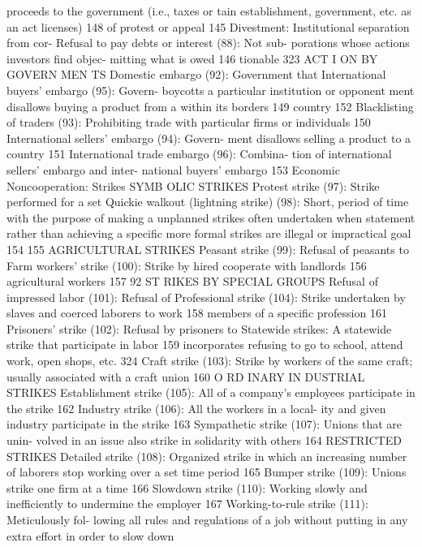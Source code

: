 \documentclass[twoside,a4paper,12pt,fleqn,openany]{extbook}
\begin{document}
 proceeds to the government (i.e., taxes or
tain establishment, government, etc. as an act
 licenses)
 148
of protest or appeal
 145
Divestment: Institutional separation from cor-
Refusal to pay debts or interest (88): Not sub-
 porations whose actions investors find objec-
mitting what is owed
 146
 tionable
 323
ACT I ON BY GOVERN MEN TS
Domestic embargo (92): Government that
 International buyers’ embargo (95): Govern-
boycotts a particular institution or opponent
 ment disallows buying a product from a
within its borders
 149
 country
 152
Blacklisting of traders (93): Prohibiting trade
with particular firms or individuals
 150
International sellers’ embargo (94): Govern-
ment disallows selling a product to a country		
151
International trade embargo (96): Combina-
tion of international sellers’ embargo and inter-
national buyers’ embargo
 153
Economic Noncooperation: Strikes
SYMB OLIC STRIKES
Protest strike (97): Strike performed for a set
 Quickie walkout (lightning strike) (98): Short,
period of time with the purpose of making a
 unplanned strikes often undertaken when
statement rather than achieving a specific
 more formal strikes are illegal or impractical		
goal
 154
 155
AGRICULTURAL STRIKES
Peasant strike (99): Refusal of peasants to
 Farm workers’ strike (100): Strike by hired
cooperate with landlords
 156
 agricultural workers
 157
92
ST RIKES BY SPECIAL GROUPS
Refusal of impressed labor (101): Refusal of
 Professional strike (104): Strike undertaken by
slaves and coerced laborers to work
 158
 members of a specific profession
 161
Prisoners’ strike (102): Refusal by prisoners to
 Statewide strikes: A statewide strike that
participate in labor
 159
 incorporates refusing to go to school, attend
work, open shops, etc.
 324
Craft strike (103): Strike by workers of the
same craft; usually associated with a craft
union
 160
O RD INARY IN DUSTRIAL STRIKES
Establishment strike (105): All of a company’s
employees participate in the strike
 162
Industry strike (106): All the workers in a local-
ity and given industry participate in the strike		
163
Sympathetic strike (107): Unions that are unin-
volved in an issue also strike in solidarity with
others
 164
RESTRICTED STRIKES
Detailed strike (108): Organized strike in which
an increasing number of laborers stop working
over a set time period
 165
Bumper strike (109): Unions strike one firm at
a time
 166
Slowdown strike (110): Working slowly and
inefficiently to undermine the employer 167
Working-to-rule strike (111): Meticulously fol-
lowing all rules and regulations of a job without
putting in any extra effort in order to slow down
\end{document}
